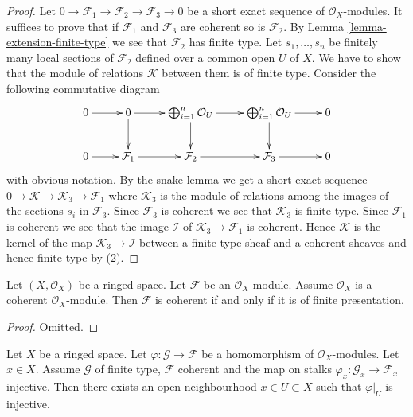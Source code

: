 \begin{proof}
\medskip\noindent
Let $0 \to \mathcal{F}_1 \to \mathcal{F}_2 \to \mathcal{F}_3 \to 0$
be a short exact sequence of $\mathcal{O}_X$-modules. It suffices
to prove that if $\mathcal{F}_1$ and $\mathcal{F}_3$ are coherent
so is $\mathcal{F}_2$. By Lemma \ref{lemma-extension-finite-type} we
see that $\mathcal{F}_2$ has finite type. Let
$s_1, \ldots, s_n$ be finitely many local
sections of $\mathcal{F}_2$ defined over a common open $U$ of $X$.
We have to show that the module of relations $\mathcal{K}$
between them is of finite type.
Consider the following commutative diagram
$$
\xymatrix{
0 \ar[r] &
0 \ar[r] \ar[d] &
\bigoplus_{i = 1}^{n} \mathcal{O}_U \ar[r] \ar[d] &
\bigoplus_{i = 1}^{n} \mathcal{O}_U \ar[r] \ar[d] &
0 \\
0 \ar[r] &
\mathcal{F}_1 \ar[r] &
\mathcal{F}_2 \ar[r] &
\mathcal{F}_3 \ar[r] &
0
}
$$
with obvious notation. By the snake lemma
we get a short exact sequence
$0 \to \mathcal{K} \to \mathcal{K}_3 \to \mathcal{F}_1$
where $\mathcal{K}_3$ is the module of relations among
the images of the sections $s_i$ in $\mathcal{F}_3$.
Since $\mathcal{F}_3$ is coherent we see that
$\mathcal{K}_3$ is finite type. Since $\mathcal{F}_1$
is coherent we see that the image $\mathcal{I}$
of $\mathcal{K}_3 \to \mathcal{F}_1$
is coherent. Hence $\mathcal{K}$
is the kernel of the map $\mathcal{K}_3 \to \mathcal{I}$
between a finite type sheaf and a coherent sheaves and hence
finite type by (2).
\end{proof}

\begin{lemma}
\label{lemma-coherent-structure-sheaf}
Let $(X, \mathcal{O}_X)$ be a ringed space.
Let $\mathcal{F}$ be an $\mathcal{O}_X$-module.
Assume $\mathcal{O}_X$ is a coherent $\mathcal{O}_X$-module.
Then $\mathcal{F}$ is coherent if and only if it is
of finite presentation.
\end{lemma}

\begin{proof}
Omitted.
\end{proof}

\begin{lemma}
\label{lemma-finite-type-to-coherent-injective-on-stalk}
Let $X$ be a ringed space.
Let $\varphi : \mathcal{G} \to \mathcal{F}$ be a homomorphism
of $\mathcal{O}_X$-modules.
Let $x \in X$. Assume $\mathcal{G}$ of finite type,
$\mathcal{F}$ coherent and the map on stalks
$\varphi_x : \mathcal{G}_x \to \mathcal{F}_x$ injective.
Then there exists an open neighbourhood
$x \in U \subset X$ such that $\varphi|_U$ is injective.
\end{lemma}

